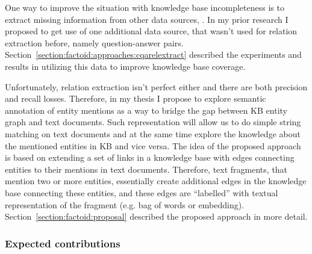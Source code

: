 One way to improve the situation with knowledge base incompleteness is to extract missing information from other data sources, \eg \cite{Cafarella:2008:WEP:1453856.1453916,Cafarella:2009:WES:1519103.1519112,Dong:2014:KVW:2623330.2623623,Etzioni:2008:OIE:1409360.1409378,Gupta:2014:BOS:2732286.2732288,kushmerick1997wrapper}.
In my prior research I proposed to get use of one additional data source, that wasn't used for relation extraction before, namely question-answer pairs.
Section~\ref{section:factoid:approaches:cqarelextract} described the experiments and results in utilizing this data to improve knowledge base coverage.

Unfortunately, relation extraction isn't perfect either and there are both precision and recall losses.
Therefore, in my thesis I propose to explore semantic annotation of entity mentions as a way to bridge the gap between KB entity graph and text documents.
Such representation will allow us to do simple string matching on text documents and at the same time explore the knowledge about the mentioned entities in KB and vice versa.
The idea of the proposed approach is based on extending a set of links in a knowledge base with edges connecting entities to their mentions in text documents.
Therefore, text fragments, that mention two or more entities, essentially create additional edges in the knowledge base connecting these entities, and these edges are ``labelled'' with textual representation of the fragment (e.g. bag of words or embedding).
Section~\ref{section:factoid:proposal} described the proposed approach in more detail.

\subsubsection{Expected contributions}
\label{section:proposal:plan:factoid:contributions}

